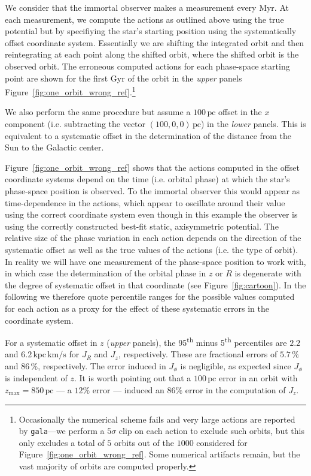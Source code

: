 \documentclass[twocolumn]{aastex62}
\newcommand{\pc}{\text{pc}}
\newcommand{\Myr}{\text{Myr}}
\newcommand{\Gyr}{\text{Gyr}}
\newcommand{\kms}{\text{km}/\text{s}}
\newcommand{\actunit}{\text{kpc}\,\kms}
\begin{document}
We consider that the immortal observer makes a measurement every $\Myr$. At each measurement, we compute the actions as outlined above using the true potential but by specifiying the star's starting position using the systematically offset coordinate system.
Essentially we are shifting the
integrated orbit and then reintegrating at each point along the shifted orbit,
where the shifted orbit is the observed orbit. The erroneous computed actions
for each phase-space starting point are shown for the first $\Gyr$ of the
orbit in the {\em upper} panels
Figure~\ref{fig:one_orbit_wrong_ref}.\footnote{Occasionally the numerical
scheme fails and very large actions are reported by \texttt{gala}---we perform
a $5\sigma$ clip on each action to exclude such orbits, but this only excludes
a total of $5$ orbits out of the $1000$ considered for
Figure~\ref{fig:one_orbit_wrong_ref}. Some numerical artifacts remain, but the
vast majority of orbits are computed properly.}
    
We also perform the same procedure but assume a $100\,\pc$ offset in the $x$
component (i.e. subtracting the vector $(100, 0, 0)\,\pc$) in the {\em lower}
panels. This is equivalent to a systematic offset in the determination of the
distance from the Sun to the Galactic center.

Figure~\ref{fig:one_orbit_wrong_ref} shows that the actions computed in the
offset coordinate systems depend on the time (i.e. orbital phase) at which the
star's phase-space position is observed. To the immortal observer this would
appear as time-dependence in the actions, which appear to oscillate around
their value using the correct coordinate system even though in this example
the observer is using the correctly constructed best-fit static, axisymmetric
potential. The relative size of the phase variation in each action depends on
the direction of the systematic offset as well as the true values of the
actions (i.e. the type of orbit). In reality we will have one measurement of
the phase-space position to work with, in which case the determination of the
orbital phase in $z$ or $R$ is degenerate with the degree of systematic offset
in that coordinate (see Figure~\ref{fig:cartoon}).  In the following we
therefore quote percentile ranges for the possible values computed for each
action as a proxy for the effect of these systematic errors in the coordinate
system.

For a systematic offset in $z$ ({\em upper} panels), the
95\textsuperscript{th} minus 5\textsuperscript{th} percentiles are $2.2$ and
$6.2\,\actunit$ for $J_R$ and $J_z$, respectively. These are fractional errors
of $5.7\,\%$ and $86\,\%$, respectively. The error induced in $J_{\phi}$ is
negligible, as expected since $J_{\phi}$ is independent of $z$. It is worth
pointing out that a $100\,\pc$ error in an orbit with
$z_{\text{max}}=850\,\pc$ --- a $12\%$ error
--- induced an $86\%$ error in the computation of $J_z$.
\end{document}
